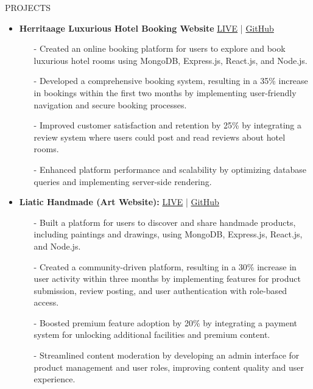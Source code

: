 \documentclass{resume} %
\begin{document}
\begin{rSection}{PROJECTS}

\begin{itemize}
    \item \textbf{Herritaage Luxurious Hotel Booking Website} \hfill {\href{https://herritage-1b537.web.app}{LIVE} | \href{https://github.com/jaynabKhatun/Luxury-hotel-booking-client-side}{GitHub}}
    \begin{itemize}
        \item[-] Created an online booking platform for users to explore and book luxurious hotel rooms using MongoDB, Express.js, React.js, and Node.js.
        \item[-] Developed a comprehensive booking system, resulting in a 35\% increase in bookings within the first two months by implementing user-friendly navigation and secure booking processes.
        \item[-] Improved customer satisfaction and retention by 25\% by integrating a review system where users could post and read reviews about hotel rooms.
        \item[-] Enhanced platform performance and scalability by optimizing database queries and implementing server-side rendering.
    \end{itemize}
    
    \item \textbf{Liatic Handmade (Art Website):} \hfill {\href{https://art-and-craft-store-fe30c.web.app}{LIVE} | \href{https://github.com/jaynabKhatun/handmade-craft-store-client-side}{GitHub}}
    \begin{itemize}
        \item[-] Built a platform for users to discover and share handmade products, including paintings and drawings, using MongoDB, Express.js, React.js, and Node.js.
        \item[-] Created a community-driven platform, resulting in a 30\% increase in user activity within three months by implementing features for product submission, review posting, and user authentication with role-based access.
        \item[-] Boosted premium feature adoption by 20\% by integrating a payment system for unlocking additional facilities and premium content.
        \item[-] Streamlined content moderation by developing an admin interface for product management and user roles, improving content quality and user experience.
    \end{itemize}

\end{itemize}

\end{rSection} 
\end{document}
